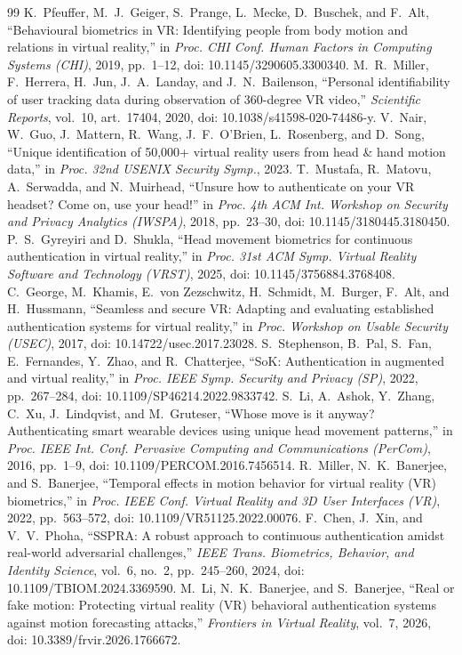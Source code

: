 \begin{thebibliography}{99}\footnotesize
{} K.~Pfeuffer, M.~J.~Geiger, S.~Prange, L.~Mecke, D.~Buschek, and F.~Alt, ``Behavioural biometrics in VR: Identifying people from body motion and relations in virtual reality,'' in \emph{Proc. CHI Conf. Human Factors in Computing Systems (CHI)}, 2019, pp.~1--12, doi: 10.1145/3290605.3300340.
 M.~R.~Miller, F.~Herrera, H.~Jun, J.~A.~Landay, and J.~N.~Bailenson, ``Personal identifiability of user tracking data during observation of 360-degree VR video,'' \emph{Scientific Reports}, vol.~10, art.~17404, 2020, doi: 10.1038/s41598-020-74486-y.
 V.~Nair, W.~Guo, J.~Mattern, R.~Wang, J.~F.~O'Brien, L.~Rosenberg, and D.~Song, ``Unique identification of 50,000+ virtual reality users from head \& hand motion data,'' in \emph{Proc. 32nd USENIX Security Symp.}, 2023.
 T.~Mustafa, R.~Matovu, A.~Serwadda, and N.~Muirhead, ``Unsure how to authenticate on your VR headset? Come on, use your head!'' in \emph{Proc. 4th ACM Int. Workshop on Security and Privacy Analytics (IWSPA)}, 2018, pp.~23--30, doi: 10.1145/3180445.3180450.
 P.~S.~Gyreyiri and D.~Shukla, ``Head movement biometrics for continuous authentication in virtual reality,'' in \emph{Proc. 31st ACM Symp. Virtual Reality Software and Technology (VRST)}, 2025, doi: 10.1145/3756884.3768408.
 C.~George, M.~Khamis, E.~von Zezschwitz, H.~Schmidt, M.~Burger, F.~Alt, and H.~Hussmann, ``Seamless and secure VR: Adapting and evaluating established authentication systems for virtual reality,'' in \emph{Proc. Workshop on Usable Security (USEC)}, 2017, doi: 10.14722/usec.2017.23028.
 S.~Stephenson, B.~Pal, S.~Fan, E.~Fernandes, Y.~Zhao, and R.~Chatterjee, ``SoK: Authentication in augmented and virtual reality,'' in \emph{Proc. IEEE Symp. Security and Privacy (SP)}, 2022, pp.~267--284, doi: 10.1109/SP46214.2022.9833742.
 S.~Li, A.~Ashok, Y.~Zhang, C.~Xu, J.~Lindqvist, and M.~Gruteser, ``Whose move is it anyway? Authenticating smart wearable devices using unique head movement patterns,'' in \emph{Proc. IEEE Int. Conf. Pervasive Computing and Communications (PerCom)}, 2016, pp.~1--9, doi: 10.1109/PERCOM.2016.7456514.
 R.~Miller, N.~K.~Banerjee, and S.~Banerjee, ``Temporal effects in motion behavior for virtual reality (VR) biometrics,'' in \emph{Proc. IEEE Conf. Virtual Reality and 3D User Interfaces (VR)}, 2022, pp.~563--572, doi: 10.1109/VR51125.2022.00076.
 F.~Chen, J.~Xin, and V.~V.~Phoha, ``SSPRA: A robust approach to continuous authentication amidst real-world adversarial challenges,'' \emph{IEEE Trans. Biometrics, Behavior, and Identity Science}, vol.~6, no.~2, pp.~245--260, 2024, doi: 10.1109/TBIOM.2024.3369590.
 M.~Li, N.~K.~Banerjee, and S.~Banerjee, ``Real or fake motion: Protecting virtual reality (VR) behavioral authentication systems against motion forecasting attacks,'' \emph{Frontiers in Virtual Reality}, vol.~7, 2026, doi: 10.3389/frvir.2026.1766672.
\end{thebibliography}
